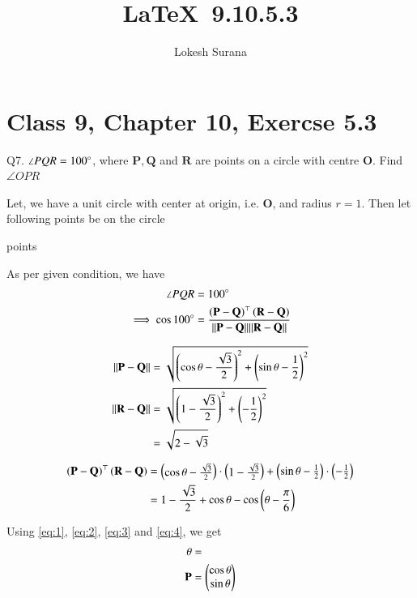\documentclass[journal,12pt,twocolumn]{IEEEtran}
\let\vec\mathbf
\begin{document}
\vspace{3cm}
\title{\LaTeX\ 9.10.5.3}
\author{Lokesh Surana}
\maketitle
\section*{Class 9, Chapter 10, Exercse 5.3}

Q7. $\angle{PQR} = 100\degree$, where $\vec{P}, \vec{Q}$ and $\vec{R}$ are points on a circle with centre $\vec{O}$. Find $\angle{OPR}$

\solution 
Let, we have a unit circle with center at origin, i.e. $\vec{O}$, and radius $r = 1$.
Then let following points be on the circle

\begin{table}[ht!]
    
    \caption{points}
    \label{tab:points}
\end{table}

As per given condition, we have
\begin{align}
    \angle{PQR} &= 100\degree \\
    \label{eq:1} \implies \cos100\degree &=  \frac{\brak{\vec{P} - \vec{Q}}^\top \brak{\vec{R} - \vec{Q}}}{\norm{\vec{P} - \vec{Q}} \norm{\vec{R} - \vec{Q}}}
\end{align}

\begin{align}
    \label{eq:2} \norm{\vec{P} - \vec{Q}} &= \sqrt{\brak{\cos\theta - \frac{\sqrt{3}}{2}}^2 + \brak{\sin\theta - \frac{1}{2}}^2} \\
    \norm{\vec{R} - \vec{Q}} &= \sqrt{\brak{1-\frac{\sqrt{3}}{2}}^2 + \brak{-\frac{1}{2}}^2} \\
    \label{eq:3} &= \sqrt{2 - \sqrt{3}}
\end{align}

\begin{align}
     \brak{\vec{P} - \vec{Q}}^\top \brak{\vec{R} - \vec{Q}} &= 
    \myvec{\cos\theta - \frac{\sqrt{3}}{2}} \cdot \myvec{1 - \frac{\sqrt{3}}{2}} + \myvec{\sin\theta - \frac{1}{2}} \cdot \myvec{-\frac{1}{2}} \\
    \label{eq:4} &= 1 - \frac{\sqrt{3}}{2} + \cos\theta - \cos\brak{\theta - \frac{\pi}{6}} 
\end{align}
    
Using \eqref{eq:1}, \eqref{eq:2}, \eqref{eq:3} and \eqref{eq:4}, we get
\begin{align}
    \theta &= \\
    \vec{P} &= \myvec{\cos\theta \\ \sin\theta}   
\end{align}
\end{document}
